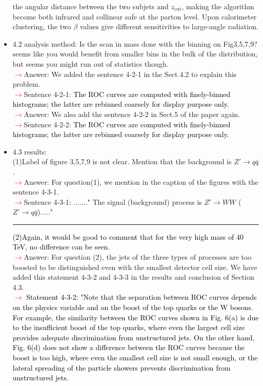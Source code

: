 \documentclass[final,1p,11pt]{elsarticle}
\begin{document}
\begin{itemize}
{the angular distance between the two subjets and $z_\mathrm{cut}$, making the 
algorithm become both infrared and collinear safe at the parton level. Upon calorimeter clustering, the two $\beta$ values give different sensitivities to large-angle radiation.}\\
\item 4.2 analysis method: Is the scan in mass done with the binning on Fig3,5,7,9? seems like you would benefit from smaller bins in the bulk of the distribution, but seems you might run out of statistics though.\\
 \textcolor{red}{$\rightarrow$}Answer: We added the sentence 4-2-1 in the Sect.4.2 to explain this problem.\\
 \textcolor{red}{$\rightarrow$}Sentence 4-2-1: \textcolor{black}{The ROC curves are computed with finely-binned histograms; the latter are rebinned coarsely for display purpose only.}\\
 \textcolor{red}{$\rightarrow$}Answer: We also add the sentence 4-2-2 in Sect.5 of the paper again.\\
 \textcolor{red}{$\rightarrow$}Sentence 4-2-2: \textcolor{black}{The ROC curves are computed with finely-binned histograms; the latter are rebinned coarsely for display purpose only.}
\item 4.3 results:\\
 (1)Label of figure 3,5,7,9 is not clear. Mention that the background is $Z'\rightarrow q\bar{q}$.\\
 \textcolor{red}{$\rightarrow$}Answer:  For question(1), we mention in the caption of the figures with the sentence 4-3-1.\\
 \textcolor{red}{$\rightarrow$}Sentence 4-3-1:  ......." The signal (background) process is $Z' \rightarrow WW$ ($Z'\rightarrow q\bar{q}$)....."\\
  \rule{\textwidth}{0.4pt}
\textcolor{black}{(2)Again, it would be good to comment that for the very high mass of 40 TeV, no difference can be seen.}\\
 \textcolor{red}{$\rightarrow$}Answer:  For question (2), the jets of the three types of processes are too boosted 
to be distinguished even with the smallest detector cell size. We have added this statement 4-3-2 and 4-3-3
in the results and conclusion of Section 4.3.\\
 \textcolor{red}{$\rightarrow$} \textcolor{black}{Statement 4-3-2: "Note that the separation between ROC curves depends on the physics variable and on the boost of the top quarks or the W bosons. For example, the similarity between the ROC curves shown in Fig. 6(a) is due to the insufficient boost of the top quarks, where even the largest cell size provides adequate discrimination from unstructured jets. On the other hand, Fig. 6(d) does not show a difference between the ROC curves because the boost is too high, where even the smallest cell size is not small enough, or the lateral spreading of the particle showers prevents discrimination from unstructured jets.  \\
}
\end{itemize}
\end{document}
